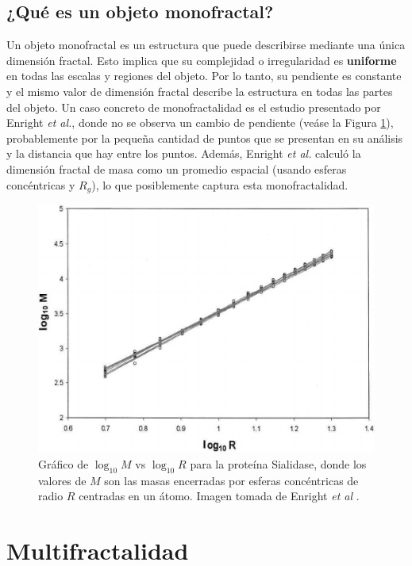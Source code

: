 \subsection*{¿Qu\'{e} es un objeto monofractal?}

Un objeto monofractal es un estructura que puede describirse mediante una \'{u}nica dimensi\'{o}n fractal. Esto implica que su complejidad o irregularidad es \textbf{uniforme} en todas las escalas y regiones del objeto. Por lo tanto, su pendiente es constante y el mismo valor de dimensi\'{o}n fractal describe la estructura en todas las partes del objeto. Un caso concreto de monofractalidad es el estudio presentado por Enright \textit{et al.}\cite{Enright2005}, donde no se observa un cambio de pendiente (ve\'{a}se la Figura \ref{fig:Enright-Fractal}), probablemente por la pequeña cantidad de puntos que se presentan en su an\'{a}lisis y la distancia que hay entre los puntos. Adem\'{a}s, Enright \textit{et al.} calcul\'{o} la dimensi\'{o}n fractal de masa como un promedio espacial (usando esferas conc\'{e}ntricas y $R_g$), lo que posiblemente captura esta monofractalidad.

\begin{figure}[H]
	\begin{center}
		\includegraphics[width=0.6\linewidth]{graphs/Enright2005}
		\caption{Gr\'{a}fico de $\log_{10}M$ vs $\log_{10}R$ para la prote\'{i}na Sialidase, donde los valores de $M$ son las masas encerradas por esferas conc\'{e}ntricas de radio $R$ centradas en un \'{a}tomo. Imagen tomada de Enright \textit{et al} \cite{Enright2005}.}
		\label{fig:Enright-Fractal}
	\end{center}
\end{figure}

\section{Multifractalidad}
\label{sec:multif}

